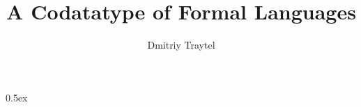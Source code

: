 \documentclass[10pt,a4paper]{article}
\begin{document}
\title{A Codatatype of Formal Languages}
\author{Dmitriy Traytel}

\maketitle


\parindent 0pt\parskip 0.5ex


\end{document}
